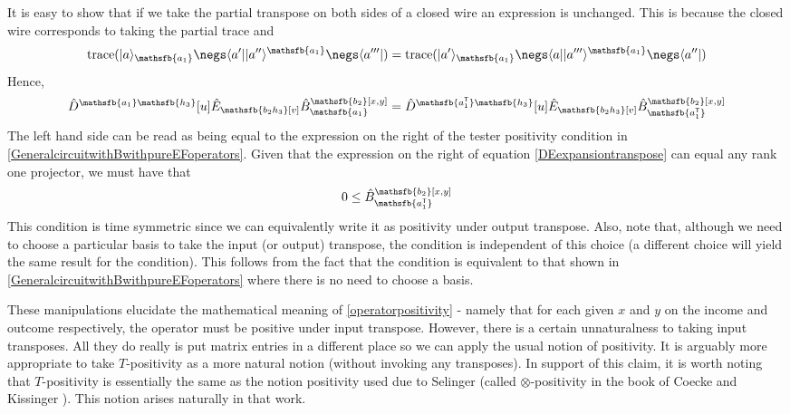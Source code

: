 \documentclass[10pt]{article}
\begin{document}
It is easy to show that if we take the partial transpose on both sides of a closed wire an expression is unchanged.  This is because the closed wire corresponds to taking the partial trace and
\begin{equation}
\text{trace}(|a\rangle_\mathsfb{a_1}\negs\langle a'| |a''\rangle^\mathsfb{a_1}\negs\langle a'''|) =
\text{trace}(|a'\rangle_\mathsfb{a_1}\negs\langle a| |a'''\rangle^\mathsfb{a_1}\negs\langle a''|)
\end{equation}
Hence,
\begin{equation}
\hat{D}^{\mathsfb{a_1}\mathsfb{h_3}}[u] \hat{E}_\mathsfb{b_2h_3}[v] \hat{B}_\mathsfb{a_1}^\mathsfb{b_2}[x,y]
=
\hat{D}^{\mathsfb{a_1^\mathsf{T}}\mathsfb{h_3}}[u] \hat{E}_\mathsfb{b_2h_3}[v] \hat{B}_\mathsfb{a_1^\mathsf{T}}^\mathsfb{b_2}[x,y]
\end{equation}
The left hand side can be read as being equal to the expression on the right of the tester positivity condition in \eqref{GeneralcircuitwithBwithpureEFoperators}.
Given that the expression on the right of equation \eqref{DEexpansiontranspose} can equal any rank one projector, we must have that
\begin{equation}
0\leq
\hat{B}_\mathsfb{a_1^\mathsf{T}}^\mathsfb{b_2}[x,y]
\end{equation}
This condition is time symmetric since we can equivalently write it as positivity under output transpose.  Also, note that, although we need to choose a particular basis to take the input (or output) transpose, the condition is independent of this choice (a different choice will yield the same result for the condition).   This follows from the fact that the condition is equivalent to that shown in \eqref{GeneralcircuitwithBwithpureEFoperators} where there is no need to choose a basis.

These manipulations elucidate the mathematical meaning of \eqref{operatorpositivity} - namely that for each given $x$ and $y$ on the income and outcome respectively, the operator must be positive under input transpose. However, there is a certain unnaturalness to taking input transposes.  All they do really is put matrix entries in a different place so we can apply the usual notion of positivity.  It is arguably more appropriate to take $T$-positivity as a more natural notion (without invoking any transposes). In support of this claim, it is worth noting that $T$-positivity is essentially the same as the notion positivity used due to Selinger \cite{selinger2007dagger} (called $\otimes$-positivity in the book of Coecke and Kissinger \cite{coecke2017picturing}).  This notion arises naturally in that work.
\end{document}
